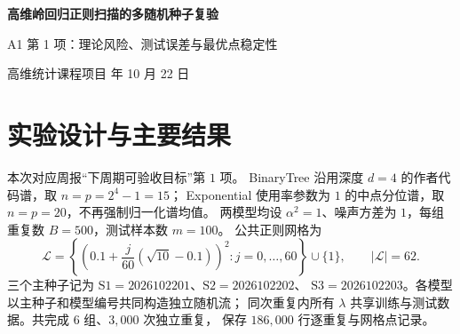 \documentclass[UTF8,fontset=fandol,a4paper,zihao=-4]{ctexart}
\numberwithin{equation}{section}
\begin{document}
\begin{center}
 {\LARGE\bfseries 高维岭回归正则扫描的多随机种子复验\par}
 \vspace{5pt}
 {\large A1 第 1 项：理论风险、测试误差与最优点稳定性\par}
 \vspace{4pt}
 {\small 高维统计课程项目 年 10 月 22 日}
\end{center}
\vspace{-3pt}
\begin{abstract}
针对 BinaryTree 与 Exponential 协方差谱模型，在实际维数样本比
$\gamma=p/n=1$ 下，分别以三个独立随机种子复验岭回归正则扫描。
每组进行 $500$ 次重复、每次使用 $100$ 个测试点，统一扫描 $62$ 个正则参数。
观测最优参数相对理论最优值 $\lambda^*=1$ 的最大偏离为 $6.37\%$；
合并种子后，两模型的观测最优点均为 $1$。
精确条件风险揭示小幅有限样本近似差异，合并 Exponential 的测试风险也存在可见偏离。
本文保留这些差异并分析其来源；全部汇总均已由逐重复原始数据独立复算。
\end{abstract}

\section{实验设计与主要结果}\label{sec:results}
本次对应周报\cite{weekly}“下周期可验收目标”第 $1$ 项。
BinaryTree 沿用深度 $d=4$ 的作者代码谱，取 $n=p=2^4-1=15$；
Exponential 使用率参数为 $1$ 的中点分位谱，取 $n=p=20$，不再强制归一化谱均值。
两模型均设 $\alpha^2=1$、噪声方差为 $1$，每组重复数 $B=500$，测试样本数 $m=100$。
公共正则网格为
\begin{equation}\label{eq:grid}
 \mathcal L=\left\{\left(0.1+\frac{j}{60}(\sqrt{10}-0.1)\right)^2:
 j=0,\ldots,60\right\}\cup\{1\},\qquad |\mathcal L|=62.
\end{equation}
三个主种子记为 $\mathrm{S1}=2026102201$、$\mathrm{S2}=2026102202$、
$\mathrm{S3}=2026102203$。各模型以主种子和模型编号共同构造独立随机流；
同次重复内所有 $\lambda$ 共享训练与测试数据。共完成 $6$ 组、$3{,}000$ 次独立重复，
保存 $186{,}000$ 行逐重复与网格点记录。
\end{document}
